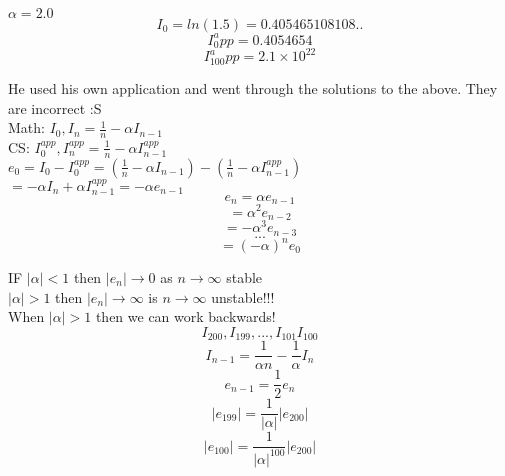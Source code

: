 \documentclass[12pt]{article}
\begin{document}
	$\alpha = 2.0$\\
	$$I_0 = ln(1.5) = 0.405465108108..$$
	$$I_0^app = 0.4054654$$
	$$I_100^app = 2.1 \times 10^{22}$$
	
	He used his own application and went through the solutions to the above. They are incorrect :S\\
	
	Math: $I_0, I_n = \frac{1}{n} - \alpha I_{n-1}$\\
	CS: $I_0^{app}, I_n^{app} = \frac{1}{n} - \alpha I_{n-1}^{app}$\\
	
	$e_0 = I_0 - I_0^{app} = (\frac{1}{n} - \alpha I_{n-1}) - (\frac{1}{n} - \alpha I_{n-1}^{app})$\\
	$= -\alpha I_{n} + \alpha I_{n-1}^{app} = -\alpha e_{n-1}$\\
	
	$$e_n = \alpha e_{n-1}$$
	$$= \alpha^2 e_{n-2}$$
	$$= - \alpha^3 e_{n-3}$$
	$$...$$
	$$= (-\alpha)^ne_0$$
	
	IF $|\alpha| < 1$ then $|e_n| \rightarrow 0$ as $n \rightarrow \infty$ stable\\
	$|\alpha| > 1$ then $|e_n| \rightarrow \infty$ is $n \rightarrow \infty$ unstable!!!\\
	
	When $|\alpha| > 1$ then we can work backwards!\\
	$$I_{200}, I_{199}, ..., I_{101}I_{100}$$
	$$I_{n-1} = \frac{1}{\alpha n} - \frac{1}{\alpha}I_n$$
	$$e_{n-1} = \frac{1}{2}e_n$$
	$$|e_{199}| = \frac{1}{|\alpha|}|e_{200}|$$
	$$|e_{100}| = \frac{1}{|\alpha|^{100}}|e_{200}|$$
	
	
\end{document}
